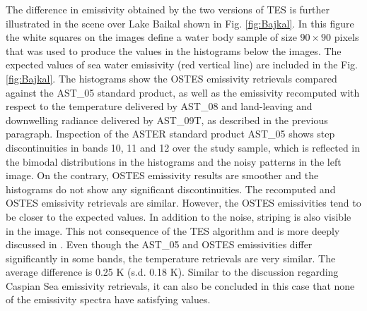 The difference in emissivity obtained by the two versions of TES is further illustrated in the scene over Lake Baikal shown in Fig. \ref{fig:Bajkal}. In this figure the white squares on the images define a water body sample of size $90 \times 90$ pixels that was used to produce the values in the histograms below the images. The expected values of sea water emissivity (red vertical line) are included in the Fig. \ref{fig:Bajkal}. The histograms show the OSTES emissivity retrievals compared against the AST\_05 standard product, as well as the emissivity recomputed with respect to the temperature delivered by AST\_08 and land-leaving and downwelling radiance delivered by AST\_09T, as described in the previous paragraph. Inspection of the ASTER standard product AST\_05 shows step discontinuities in bands 10, 11 and 12 over the study sample, which is reflected in the bimodal distributions in the histograms and the noisy patterns in the left image. On the contrary, OSTES emissivity results are smoother and the histograms do not show any significant discontinuities. The recomputed and OSTES emissivity retrievals are similar. However, the OSTES emissivities tend to be closer to the expected values. In addition to the noise, striping is also visible in the image. This not consequence of the TES algorithm and is more deeply discussed in \cite{GA11}. Even though the AST\_05 and OSTES emissivities differ significantly in some bands, the temperature retrievals are very similar. The average difference is 0.25 K (s.d. 0.18 K). Similar to the discussion regarding Caspian Sea emissivity retrievals, it can also be concluded in this case that none of the emissivity spectra have satisfying values.

